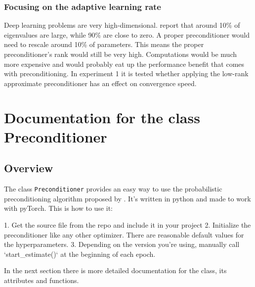 \documentclass[twoside,12pt,a4paper]{report}
\begin{document}
\subsubsection{Focusing on the adaptive learning rate}
Deep learning problems are very high-dimensional. \cite{Chaudhari2017entropy} report that around 10\% of eigenvalues are large, while 90\% are close to zero. A proper preconditioner would need to rescale around 10\% of parameters. This means the proper preconditioner's rank would still be very high. Computations would be much more expensive and would probably eat up the performance benefit that comes with preconditioning.
In experiment 1 it is tested whether applying the low-rank approximate preconditioner has an effect on convergence speed.

\section{Documentation for the class Preconditioner}
\subsection{Overview}
The class \verb|Preconditioner| provides an easy way to use the probabilistic preconditioning algorithm proposed by \cite{roos2019active}. It's written in python and made to work with pyTorch.
This is how to use it:

\begin{markdown}
1. Get the source file from the repo and include it in your project
2. Initialize the preconditioner like any other optimizer. There are reasonable default values for the hyperparameters.
3. Depending on the version you're using, manually call `start_estimate()` at the beginning of each epoch.

In the next section there is more detailed documentation for the class, its attributes and functions.
\end{markdown}
\end{document}
